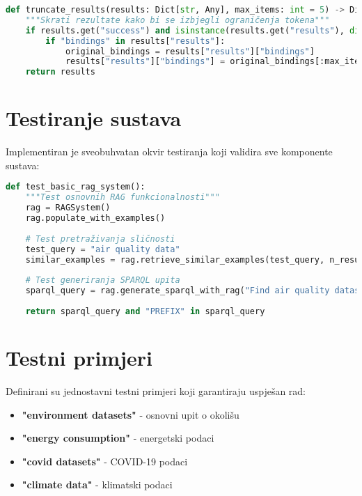 \begin{lstlisting}[language=Python, caption=Upravljanje ograničenjima tokena]
def truncate_results(results: Dict[str, Any], max_items: int = 5) -> Dict[str, Any]:
    """Skrati rezultate kako bi se izbjegli ograničenja tokena"""
    if results.get("success") and isinstance(results.get("results"), dict):
        if "bindings" in results["results"]:
            original_bindings = results["results"]["bindings"]
            results["results"]["bindings"] = original_bindings[:max_items]
    return results
\end{lstlisting}

\section{Testiranje sustava}
\label{sec:testing_system}

Implementiran je sveobuhvatan okvir testiranja koji validira sve komponente sustava:

\begin{lstlisting}[language=Python, caption=Jednostavan test RAG sustava]
def test_basic_rag_system():
    """Test osnovnih RAG funkcionalnosti"""
    rag = RAGSystem()
    rag.populate_with_examples()
    
    # Test pretraživanja sličnosti
    test_query = "air quality data"
    similar_examples = rag.retrieve_similar_examples(test_query, n_results=2)
    
    # Test generiranja SPARQL upita
    sparql_query = rag.generate_sparql_with_rag("Find air quality datasets")
    
    return sparql_query and "PREFIX" in sparql_query
\end{lstlisting}

\section{Testni primjeri}
\label{sec:test_examples}

Definirani su jednostavni testni primjeri koji garantiraju uspješan rad:

\begin{itemize}
    \item \textbf{"environment datasets"} - osnovni upit o okolišu
    \item \textbf{"energy consumption"} - energetski podaci
    \item \textbf{"covid datasets"} - COVID-19 podaci
    \item \textbf{"climate data"} - klimatski podaci
\end{itemize}


